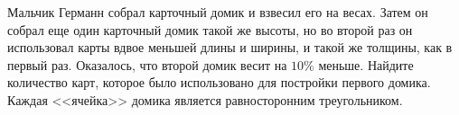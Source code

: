 Мальчик Германн собрал карточный домик и взвесил его на весах. Затем он собрал еще один карточный домик такой же высоты, но во второй раз он использовал карты вдвое меньшей длины и ширины, и такой же толщины, как в первый раз. Оказалось, что второй домик весит на $10\%$ меньше. Найдите количество карт, которое было использовано для постройки первого домика.\\
	 Каждая <<ячейка>> домика является равносторонним треугольником.